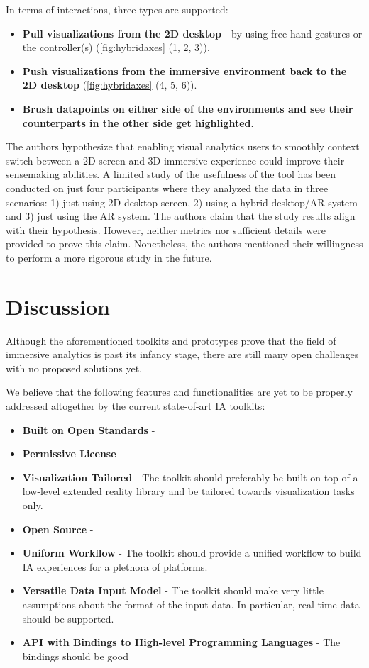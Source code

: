 \documentclass{vgtc}                          %
\begin{document}
\smallskip

\noindent In terms of interactions, three types are supported:
\begin{itemize}
	\item \textbf{Pull visualizations from the 2D desktop} - by using free-hand gestures
	      or the controller(s) (\cref{fig:hybridaxes} (1, 2, 3)).
	\item \textbf{Push visualizations from the immersive environment back to the 2D
		      desktop} (\cref{fig:hybridaxes} (4, 5, 6)).
	\item \textbf{Brush datapoints on either side of the environments and see their
		      counterparts in the other side get highlighted}.
\end{itemize}


\noindent The authors hypothesize that enabling visual analytics users to
smoothly context switch between a 2D screen and 3D immersive experience could
improve their sensemaking abilities. A limited study of the usefulness of the
tool has been conducted on just four participants where they analyzed the data
in three scenarios: 1) just using 2D desktop screen, 2) using a hybrid
desktop/AR system and 3) just using the AR system. The authors claim that the
study results align with their hypothesis. However, neither metrics nor
sufficient details were provided to prove this claim. Nonetheless, the authors
mentioned their willingness to perform a more rigorous study in the future.

\section{Discussion}

Although the aforementioned toolkits and prototypes prove that the field of
immersive analytics is past its infancy stage, there are still many open
challenges with no proposed solutions yet.

\medskip

We believe that the following features and functionalities are yet to be
properly addressed altogether by the current state-of-art IA toolkits:

\begin{itemize}
	\item \textbf{Built on Open Standards} -
	\item \textbf{Permissive License} -
	\item \textbf{Visualization Tailored} - The toolkit should preferably be
	      built on top of a low-level extended reality library and be tailored
	      towards visualization tasks only.
	\item \textbf{Open Source} -
	\item \textbf{Uniform Workflow} - The toolkit should provide a unified
	      workflow to build IA experiences for a plethora of platforms.
	\item \textbf{Versatile Data Input Model} - The toolkit should make very
	      little assumptions about the format of the input data. In particular,
	      real-time data should be supported.
	\item \textbf{API with Bindings to High-level Programming Languages} - The
	      bindings should be good
\end{itemize}
\end{document}
